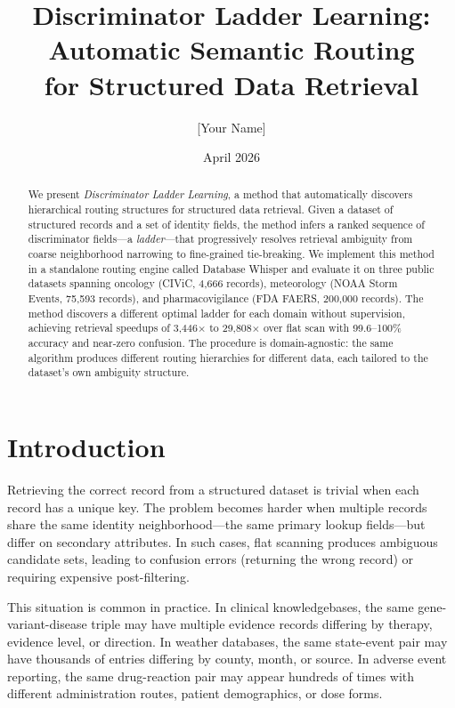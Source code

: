 \documentclass[11pt]{article}
\title{Discriminator Ladder Learning: Automatic Semantic Routing \\ for Structured Data Retrieval}
\author{[Your Name]}
\affil{Independent Researcher}
\date{April 2026}
\begin{document}
\maketitle

\begin{abstract}
We present \textit{Discriminator Ladder Learning}, a method that automatically discovers hierarchical routing structures for structured data retrieval. Given a dataset of structured records and a set of identity fields, the method infers a ranked sequence of discriminator fields---a \textit{ladder}---that progressively resolves retrieval ambiguity from coarse neighborhood narrowing to fine-grained tie-breaking. We implement this method in a standalone routing engine called Database Whisper and evaluate it on three public datasets spanning oncology (CIViC, 4{,}666 records), meteorology (NOAA Storm Events, 75{,}593 records), and pharmacovigilance (FDA FAERS, 200{,}000 records). The method discovers a different optimal ladder for each domain without supervision, achieving retrieval speedups of 3{,}446$\times$ to 29{,}808$\times$ over flat scan with 99.6--100\% accuracy and near-zero confusion. The procedure is domain-agnostic: the same algorithm produces different routing hierarchies for different data, each tailored to the dataset's own ambiguity structure.
\end{abstract}

\section{Introduction}

Retrieving the correct record from a structured dataset is trivial when each record has a unique key. The problem becomes harder when multiple records share the same identity neighborhood---the same primary lookup fields---but differ on secondary attributes. In such cases, flat scanning produces ambiguous candidate sets, leading to confusion errors (returning the wrong record) or requiring expensive post-filtering.

This situation is common in practice. In clinical knowledgebases, the same gene-variant-disease triple may have multiple evidence records differing by therapy, evidence level, or direction. In weather databases, the same state-event pair may have thousands of entries differing by county, month, or source. In adverse event reporting, the same drug-reaction pair may appear hundreds of times with different administration routes, patient demographics, or dose forms.
\end{document}
